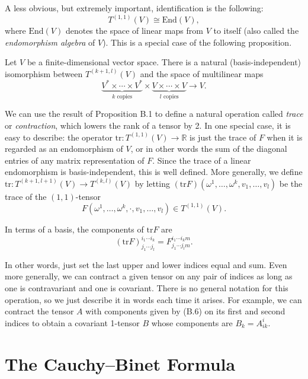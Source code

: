 A less obvious, but extremely important, identification is the following:
\[
T^{(1,1)}(V) \cong \text{End}(V),
\]
where $\text{End}(V)$ denotes the space of linear maps from $V$ to itself (also called the \emph{endomorphism algebra} of $V$). This is a special case of the following proposition.

\begin{proposition}
\label{prop:multilinear-maps-tensor-isomorphism}
Let $V$ be a finite-dimensional vector space. There is a natural (basis-independent) isomorphism between $T^{(k+1,l)}(V)$ and the space of multilinear maps
\[
\underbrace{V^* \times \cdots \times V^*}_{k \text{ copies}} \times \underbrace{V \times \cdots \times V}_{l \text{ copies}} \to V.
\]
\end{proposition}

\noindent We can use the result of Proposition B.1 to define a natural operation called \textit{trace} or \textit{contraction}, which lowers the rank of a tensor by 2. In one special case, it is easy to describe: the operator $\mathrm{tr}: T^{(1,1)}(V) \to \mathbb{R}$ is just the trace of $F$ when it is regarded as an endomorphism of $V$, or in other words the sum of the diagonal entries of any matrix representation of $F$. Since the trace of a linear endomorphism is basis-independent, this is well defined. More generally, we define $\mathrm{tr}: T^{(k+1,l+1)}(V) \to T^{(k,l)}(V)$ by letting $(\mathrm{tr} F)(\omega^1,\ldots,\omega^k, v_1,\ldots,v_l)$ be the trace of the $(1,1)$-tensor
\[
F(\omega^1,\ldots,\omega^k,\cdot, v_1,\ldots,v_l) \in T^{(1,1)}(V).
\]

In terms of a basis, the components of $\mathrm{tr} F$ are
\[
(\mathrm{tr} F)_{j_1 \cdots j_l}^{i_1 \cdots i_k} = F_{j_1 \cdots j_l m}^{i_1 \cdots i_k m}.
\]

In other words, just set the last upper and lower indices equal and sum. Even more generally, we can contract a given tensor on any pair of indices as long as one is contravariant and one is covariant. There is no general notation for this operation, so we just describe it in words each time it arises. For example, we can contract the tensor $A$ with components given by (B.6) on its first and second indices to obtain a covariant 1-tensor $B$ whose components are $B_k = A^i_{i k}$.

\section{The Cauchy--Binet Formula}

